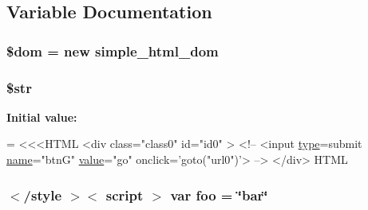 \subsection{Variable Documentation}
\hypertarget{strip__testcase_8php_a46127a794280dd592812c25b62af34b0}{
\subsubsection[{\$dom}]{\setlength{\rightskip}{0pt plus 5cm}\$dom = new {\bf simple\+\_\+html\+\_\+dom}}}\label{strip__testcase_8php_a46127a794280dd592812c25b62af34b0}
\hypertarget{strip__testcase_8php_a7542d95618011800c61773127fa625cf}{
\subsubsection[{\$str}]{\setlength{\rightskip}{0pt plus 5cm}\$str}}\label{strip__testcase_8php_a7542d95618011800c61773127fa625cf}
{\bfseries Initial value\+:}
\begin{DoxyCode}
= <<<HTML
<div \textcolor{keyword}{class}=\textcolor{stringliteral}{"class0"} \textcolor{keywordtype}{id}=\textcolor{stringliteral}{"id0"} >
    <!--
        <input \hyperlink{dom__testcase_8php_a2dac418d51f3729b0a56d68ba81f17b1}{type}=submit \hyperlink{jquery_8js_a7e76f3957f225b9a14d6fab0a55392ce}{name}=\textcolor{stringliteral}{"btnG"} \hyperlink{dom__testcase_8php_aa1e367627f46ba8a185ec02e58272f80}{value}=\textcolor{stringliteral}{"go"} onclick=\textcolor{stringliteral}{'goto("url0")'}>
    -->
</div>
HTML
\end{DoxyCode}
\hypertarget{strip__testcase_8php_aa901575d6c772d2340f7e16cf7028985}{
\subsubsection[{foo}]{\setlength{\rightskip}{0pt plus 5cm}$<$/style $>$$<$ script $>$ var foo = \char`\"{}bar\char`\"{}}}\label{strip__testcase_8php_aa901575d6c772d2340f7e16cf7028985}
